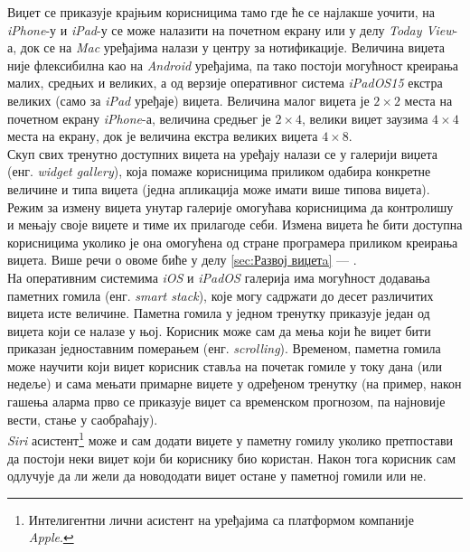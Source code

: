 \documentclass[12pt,oneside]{memoir}
\begin{document}
\indent Виџет се приказује крајњим корисницима тамо где ће се најлакше уочити, на \textit{iPhone}-у и \textit{iPad}-у се може налазити на почетном екрану или у делу \textit{Today View}-а, док се на \textit{Mac} уређајима налази у центру за нотификације. Величина виџета није флексибилна као на \textit{Android} уређајима, па тако постоји могућност креирања малих, средњих и великих, а од верзије оперативног система \textit{iPadOS15} екстра великих (само за \textit{iPad} уређаје) виџета. Величина малог виџета је $2 \times 2$ места на почетном екрану \textit{iPhone}-а, величина средњег је $2 \times 4$, велики виџет заузима $4 \times 4$ места на екрану, док је величина екстра великих виџета $4 \times 8$.
\\
\indent Скуп свих тренутно доступних виџета на уређају налази се у галерији виџета (енг. \textit{widget gallery}), која помаже корисницима приликом одабира конкретне величине и типа виџета (једна апликација може имати више типова виџета). Режим за измену виџета унутар галерије омогућава корисницима да контролишу и мењају своје виџете и тиме их прилагоде себи. Измена виџета ће бити доступна корисницима уколико је она омогућена од стране програмера приликом креирања виџета. Више речи о овоме биће у делу \ref{sec:Развој виџетa} --- .
\\
\indent На оперативним системима \textit{iOS} и \textit{iPadOS} галерија има могућност додавања паметних гомила (енг. \textit{smart stack}), које могу садржати до десет различитих виџета исте величине. Паметна гомила у једном тренутку приказује један од виџета који се налазе у њој. Корисник може сам да мења који ће виџет бити приказан једноставним померањем (енг. \textit{scrolling}). Временом, паметна гомила може научити који виџет корисник ставља на почетак гомиле у току дана (или недеље) и сама мењати примарне виџете у одређеном тренутку (на пример, након гашења аларма прво се приказује виџет са временском прогнозом, па најновије вести, стање у саобраћају).
\\
\indent \textit{Siri} асистент\footnote{Интелигентни лични асистент на уређајима са платформом компаније \textit{Apple}.} може и сам додати виџете у паметну гомилу уколико претпостави да постоји неки виџет који би кориснику био користан. Након тога корисник сам одлучује да ли жели да новододати виџет остане у паметној гомили или не.
\end{document}
